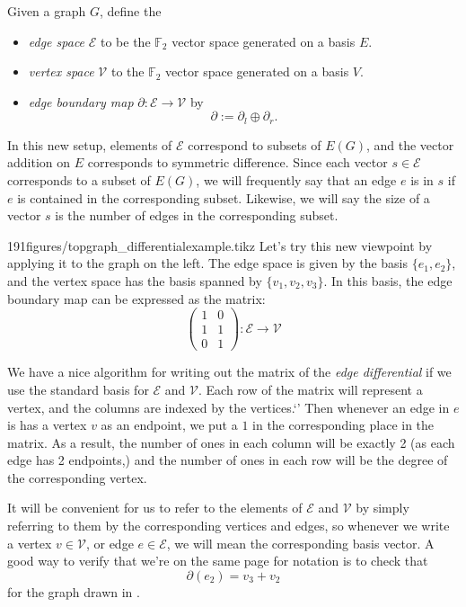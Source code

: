 \begin{definition} Given a graph $G$, define the
\begin{itemize}
\item \emph{edge space} $\mathcal E$ to be the $\mathbb F_2$ vector space generated on a basis $E$. 
\item \emph{vertex space} $\mathcal V$ to the $\mathbb F_2$ vector space generated on a basis $V$. 
\item \emph{edge boundary map} $\partial: \mathcal E\to \mathcal V$ by 
\[\partial:= \partial_l\oplus \partial_r.\]
\end{itemize}
\label{def:graphcomplex}
\end{definition}
In this new setup,  elements of $\mathcal E$ correspond to subsets of $E(G)$, and the vector addition on $E$ corresponds to symmetric difference. Since each vector $s\in \mathcal E$ corresponds to a subset of $E(G)$, we will frequently say that an edge $e$ is in $s$ if $e$ is contained in the corresponding subset. Likewise, we will say the size of a vector $s$ is the number of edges in the corresponding subset. 

\begin{examplefigureenv}{191figures/topgraph_differentialexample.tikz}
	\label{exam:simplegraph}
	Let's try this new viewpoint by applying it to the  graph on the left. The edge space is given by the basis  $\{e_1,e_2\}$, and the vertex space has the basis spanned by $\{v_1, v_2, v_3\}$.
	In this basis, the edge boundary map can be expressed as the matrix:
\[\begin{pmatrix}
1&0\\
1&1\\
0&1
\end{pmatrix}: \mathcal E\to \mathcal V
\]
\end{examplefigureenv}
We have a nice algorithm for writing out the matrix of the \emph{edge differential} if we use the standard basis for $\mathcal E$ and $\mathcal V$. Each row of the matrix will represent a vertex, and the columns are indexed by the vertices.`'
Then whenever an edge in $e$ is has a vertex $v$ as an endpoint, we put a $1$ in the corresponding place in the matrix. As a result, the number of ones in each column will be exactly 2 (as each edge has 2 endpoints,) and the number of ones in each row will be the degree of the corresponding vertex. 

It will be convenient for us to refer to the elements of $\mathcal E$ and $\mathcal V$ by simply referring to them by the corresponding vertices and edges, so whenever we write a vertex $v\in \mathcal V$, or edge $e\in \mathcal E$, we will mean the corresponding basis vector.
A good way to verify that we're on the same page for notation is to check that 
\[\partial (e_2)=v_3+v_2\]
for the graph drawn in .

